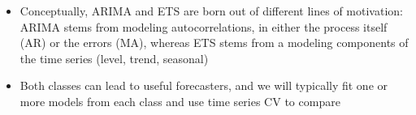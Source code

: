 \documentclass{article}
\begin{document}
\begin{itemize}
\item Conceptually, ARIMA and ETS are born out of different lines of motivation:
  ARIMA stems from modeling autocorrelations, in either the process itself (AR)
  or the errors (MA), whereas ETS stems from a modeling components of the time
  series (level, trend, seasonal)

\item Both classes can lead to useful forecasters, and we will typically fit one
  or more models from each class and use time series CV to compare    
\end{itemize}
\end{document}
